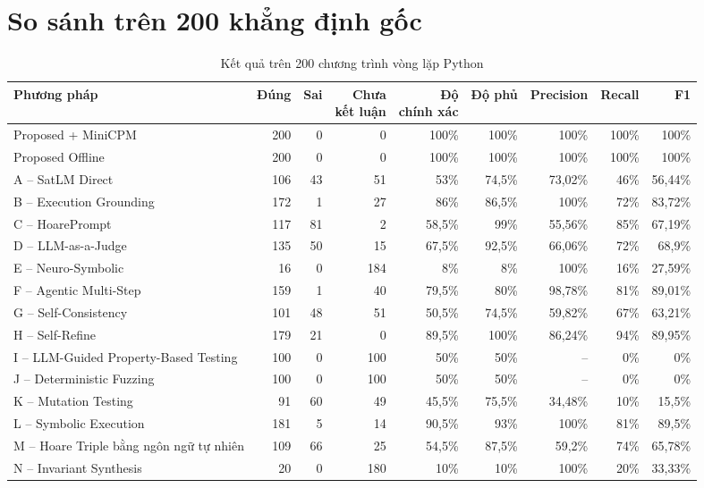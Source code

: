\section{So sánh trên 200 khẳng định gốc}
\label{sec:overall_benchmark_results}

\begin{table}[htbp]
\centering
\footnotesize
\setlength{\tabcolsep}{3pt}
\caption{Kết quả trên 200 chương trình vòng lặp Python}
\label{tab:benchmark-overall-expanded}
\begin{tabular}{@{}p{}rrrrrrrr@{}}
\toprule
\textbf{Phương pháp} & \textbf{Đúng} & \textbf{Sai} & \makecell[r]{\textbf{Chưa}\\\textbf{kết luận}} & \makecell[r]{\textbf{Độ}\\\textbf{chính xác}} & \textbf{Độ phủ} & \textbf{Precision} & \textbf{Recall} & \textbf{F1} \\
\midrule
Proposed + MiniCPM & 200 & 0 & 0 & 100\% & 100\% & 100\% & 100\% & 100\% \\
Proposed Offline & 200 & 0 & 0 & 100\% & 100\% & 100\% & 100\% & 100\% \\
A -- SatLM Direct & 106 & 43 & 51 & 53\% & 74,5\% & 73,02\% & 46\% & 56,44\% \\
B -- Execution Grounding & 172 & 1 & 27 & 86\% & 86,5\% & 100\% & 72\% & 83,72\% \\
C -- HoarePrompt & 117 & 81 & 2 & 58,5\% & 99\% & 55,56\% & 85\% & 67,19\% \\
D -- LLM-as-a-Judge & 135 & 50 & 15 & 67,5\% & 92,5\% & 66,06\% & 72\% & 68,9\% \\
E -- Neuro-Symbolic & 16 & 0 & 184 & 8\% & 8\% & 100\% & 16\% & 27,59\% \\
F -- Agentic Multi-Step & 159 & 1 & 40 & 79,5\% & 80\% & 98,78\% & 81\% & 89,01\% \\
G -- Self-Consistency & 101 & 48 & 51 & 50,5\% & 74,5\% & 59,82\% & 67\% & 63,21\% \\
H -- Self-Refine & 179 & 21 & 0 & 89,5\% & 100\% & 86,24\% & 94\% & 89,95\% \\
I -- LLM-Guided Property-Based Testing & 100 & 0 & 100 & 50\% & 50\% & -- & 0\% & 0\% \\
J -- Deterministic Fuzzing & 100 & 0 & 100 & 50\% & 50\% & -- & 0\% & 0\% \\
K -- Mutation Testing & 91 & 60 & 49 & 45,5\% & 75,5\% & 34,48\% & 10\% & 15,5\% \\
L -- Symbolic Execution & 181 & 5 & 14 & 90,5\% & 93\% & 100\% & 81\% & 89,5\% \\
M -- Hoare Triple bằng ngôn ngữ tự nhiên & 109 & 66 & 25 & 54,5\% & 87,5\% & 59,2\% & 74\% & 65,78\% \\
N -- Invariant Synthesis & 20 & 0 & 180 & 10\% & 10\% & 100\% & 20\% & 33,33\% \\
\bottomrule
\end{tabular}
\end{table}

